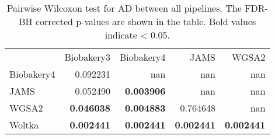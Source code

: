 \begin{table}
\caption{Pairwise Wilcoxon test for AD between all pipelines. The FDR-BH corrected p-values are shown in the table. Bold values indicate < 0.05.}
\label{tab:pairwise_AD}
\begin{tabular}{lrrrr}
 & Biobakery3 & Biobakery4 & JAMS & WGSA2 \\
Biobakery4 & 0.092231 & nan & nan & nan \\
JAMS & 0.052490 & \bfseries 0.003906 & nan & nan \\
WGSA2 & \bfseries 0.046038 & \bfseries 0.004883 & 0.764648 & nan \\
Woltka & \bfseries 0.002441 & \bfseries 0.002441 & \bfseries 0.002441 & \bfseries 0.002441 \\
\end{tabular}
\end{table}
